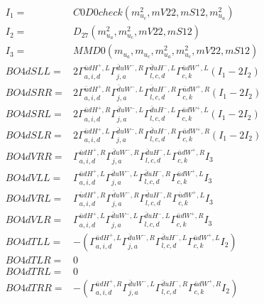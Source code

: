 \documentclass[A4,landscape]{article}
\begin{document}
\begin{align} 
I_1 = & C0D0check(m^2_{u_{{c}}}, mV22, mS12, m^2_{u_{{a}}}) \\ 
I_2 = & D_{27}(m^2_{u_{{a}}}, m^2_{u_{{c}}}, mV22, mS12) \\ 
I_3 = & MMD0(m_{u_{{a}}}, m_{u_{{c}}}, m^2_{u_{{a}}}, m^2_{u_{{c}}}, mV22, mS12) \\ 
  BO4dSLL= & 2  \Gamma^{\bar{u}d H^+,L}_{a, i, d} \Gamma^{\bar{d}u W^- ,R}_{j, a} \Gamma^{\bar{d}u H^- ,L}_{l, c, d} \Gamma^{\bar{u}d W^+,L}_{c, k} (I_1 - 2 I_2) \\ 
  BO4dSRR= & 2  \Gamma^{\bar{u}d H^+,R}_{a, i, d} \Gamma^{\bar{d}u W^- ,L}_{j, a} \Gamma^{\bar{d}u H^- ,R}_{l, c, d} \Gamma^{\bar{u}d W^+,R}_{c, k} (I_1 - 2 I_2) \\ 
  BO4dSRL= & 2  \Gamma^{\bar{u}d H^+,R}_{a, i, d} \Gamma^{\bar{d}u W^- ,L}_{j, a} \Gamma^{\bar{d}u H^- ,L}_{l, c, d} \Gamma^{\bar{u}d W^+,L}_{c, k} (I_1 - 2 I_2) \\ 
  BO4dSLR= & 2  \Gamma^{\bar{u}d H^+,L}_{a, i, d} \Gamma^{\bar{d}u W^- ,R}_{j, a} \Gamma^{\bar{d}u H^- ,R}_{l, c, d} \Gamma^{\bar{u}d W^+,R}_{c, k} (I_1 - 2 I_2) \\ 
  BO4dVRR= &  \Gamma^{\bar{u}d H^+,R}_{a, i, d} \Gamma^{\bar{d}u W^- ,R}_{j, a} \Gamma^{\bar{d}u H^- ,L}_{l, c, d} \Gamma^{\bar{u}d W^+,R}_{c, k} I_3 \\ 
  BO4dVLL= &  \Gamma^{\bar{u}d H^+,L}_{a, i, d} \Gamma^{\bar{d}u W^- ,L}_{j, a} \Gamma^{\bar{d}u H^- ,R}_{l, c, d} \Gamma^{\bar{u}d W^+,L}_{c, k} I_3 \\ 
  BO4dVRL= &  \Gamma^{\bar{u}d H^+,R}_{a, i, d} \Gamma^{\bar{d}u W^- ,R}_{j, a} \Gamma^{\bar{d}u H^- ,R}_{l, c, d} \Gamma^{\bar{u}d W^+,L}_{c, k} I_3 \\ 
  BO4dVLR= &  \Gamma^{\bar{u}d H^+,L}_{a, i, d} \Gamma^{\bar{d}u W^- ,L}_{j, a} \Gamma^{\bar{d}u H^- ,L}_{l, c, d} \Gamma^{\bar{u}d W^+,R}_{c, k} I_3 \\ 
  BO4dTLL= & -( \Gamma^{\bar{u}d H^+,L}_{a, i, d} \Gamma^{\bar{d}u W^- ,R}_{j, a} \Gamma^{\bar{d}u H^- ,L}_{l, c, d} \Gamma^{\bar{u}d W^+,L}_{c, k} I_2) \\ 
  BO4dTLR= & 0 \\ 
  BO4dTRL= & 0 \\ 
  BO4dTRR= & -( \Gamma^{\bar{u}d H^+,R}_{a, i, d} \Gamma^{\bar{d}u W^- ,L}_{j, a} \Gamma^{\bar{d}u H^- ,R}_{l, c, d} \Gamma^{\bar{u}d W^+,R}_{c, k} I_2) \\ 
\end{align} 
\end{document}
